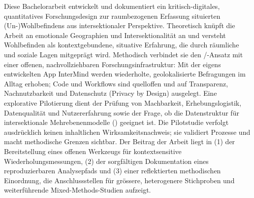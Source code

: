Diese Bachelorarbeit entwickelt und dokumentiert ein kritisch-digitales, quantitatives Forschungsdesign zur raumbezogenen Erfassung situierten (Un-)Wohlbefindens aus intersektionaler Perspektive. Theoretisch knüpft die Arbeit an emotionale Geographien und Intersektionalität an und versteht Wohlbefinden als kontextgebundene, situative Erfahrung, die durch räumliche und soziale Lagen mitgeprägt wird. Methodisch verbindet sie den /-Ansatz mit einer offenen, nachvollziehbaren Forschungsinfrastruktur: Mit der eigens entwickelten App InterMind werden wiederholte, geolokalisierte Befragungen im Alltag erhoben; Code und Workflows sind quelloffen und auf Transparenz, Nachnutzbarkeit und Datenschutz (Privacy by Design) ausgelegt. Eine explorative Pilotierung dient der Prüfung von Machbarkeit, Erhebungslogistik, Datenqualität und Nutzererfahrung sowie der Frage, ob die Datenstruktur für intersektionale Mehrebenenmodelle () geeignet ist. Die Pilotstudie verfolgt ausdrücklich keinen inhaltlichen Wirksamkeitsnachweis; sie validiert Prozesse und macht methodische Grenzen sichtbar. Der Beitrag der Arbeit liegt in (1) der Bereitstellung eines offenen Werkzeugs für kontextsensitive Wiederholungsmessungen, (2) der sorgfältigen Dokumentation eines reproduzierbaren Analysepfads und (3) einer reflektierten methodischen Einordnung, die Anschlussstellen für grössere, heterogenere Stichproben und weiterführende Mixed-Methods-Studien aufzeigt.